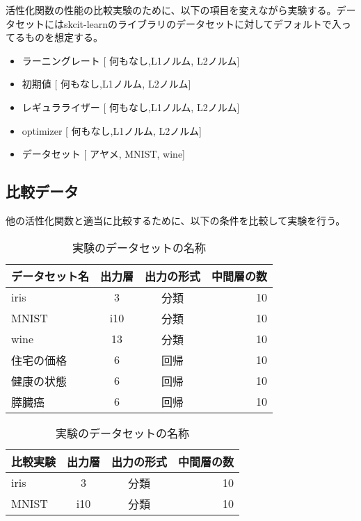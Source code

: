 活性化関数の性能の比較実験のために、以下の項目を変えながら実験する。データセットにはskcit-learnのライブラリのデータセットに対してデフォルトで入ってるものを想定する。
\begin{itemize}

    \setlength{\parskip}{0cm} %
    \setlength{\itemsep}{0cm} %
    \item ラーニングレート [ 何もなし,L1ノルム, L2ノルム]
    \item 初期値 [ 何もなし,L1ノルム, L2ノルム]
    \item レギュラライザー [ 何もなし,L1ノルム, L2ノルム]
    \item optimizer [ 何もなし,L1ノルム, L2ノルム]
    \item データセット [ アヤメ, MNIST, wine]
\end{itemize}



\subsection{比較データ}

他の活性化関数と適当に比較するために、以下の条件を比較して実験を行う。


\begin{table}[htbp]
    \begin{center}
        \caption{実験のデータセットの名称}
        \vspace{5mm} 
        \begin{tabular}{l*{2}{c}r}
        データセット名      & 出力層 & 出力の形式 & 中間層の数 \\
        \hline
        iris            & 3  & 分類 & 10  \\
        MNIST               & i10 & 分類 & 10   \\
        wine        & 13 & 分類 & 10  \\
        住宅の価格           & 6 & 回帰 & 10  \\
        健康の状態           & 6 & 回帰 & 10  \\
        膵臓癌           & 6 & 回帰 & 10  \\
        \end{tabular}
    \end{center}
\end{table}

\begin{table}[htbp]
    \begin{center}
        \caption{実験のデータセットの名称}
        \vspace{5mm} 
        \begin{tabular}{l*{2}{c}r}
        比較実験      & 出力層 & 出力の形式 & 中間層の数 \\
        \hline
        iris            & 3  & 分類 & 10  \\
        MNIST               & i10 & 分類 & 10   \\
        \end{tabular}
    \end{center}
\end{table}


